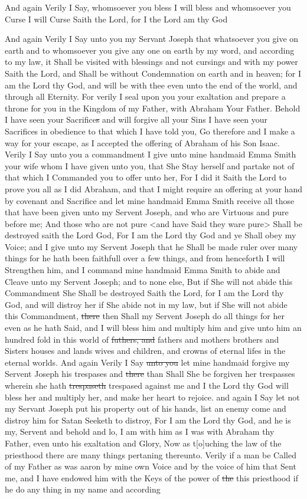 				And again Verily I Say, whomsoever you bless I will bless and whomsoever you Curse I will Curse Saith the Lord, for I the Lord am thy God

				And again Verily I Say unto you my Servant Joseph that whatsoever you give on earth and to whomsoever you give any one on earth by my word, and according to my law, it Shall be visited with blessings and not cursings and with my power Saith the Lord, and Shall be without Condemnation on earth and in heaven; for I am the Lord thy God, and will be with thee even unto the end of the world, and through all Eternity. For verily I seal upon you your exaltation and prepare a throne for you in the Kingdom of my Father, with Abraham Your Father. Behold I have seen your Sacrifice\sout{s} and will forgive all your Sins I have seen your Sacrifices in obedience to that which I have told you, Go therefore and I make a way for your escape, as I accepted the offering of Abraham of his Son Isaac. Verily I Say unto you a commandment I give unto mine handmaid Emma Smith your wife whom I have given unto you, that She Stay herself and partake not of that which I Commanded you to offer unto her, For I did it Saith the Lord to prove you all as I did Abraham, and that I might require an offering at your hand by covenant and Sacrifice and let mine handmaid Emma Smith receive all those that have been given unto my Servent Joseph, and who are Virtuous and pure before me; And those who are not pure <and have Said they ware pure> Shall be destroyed saith the Lord God, For I am the Lord thy God and ye Shall obey my Voice; and I give unto my Servent Joseph that he Shall be made ruler over many things for he hath been faithfull over a few things, and from henceforth I will Strengthen him, and I command mine handmaid Emma Smith to abide and Cleave unto my Servent Joseph; and to none else, But if She will not abide this Commandment She Shall be destroyed Saith the Lord, for I am the Lord thy God, and will distroy her if She abide not in my law, but if She will not abide this Commandment, \sout{there} then Shall my Servent Joseph do all things for her even as he hath Said, and I will bless him and multiply him and give unto him an hundred fold in this world of \sout{futhers, and} fathers and mothers brothers and Sisters houses and lands wives and children, and crowns of eternal lifes in the eternal worlds. And again Verily I Say \sout{unto you} let mine handmaid forgive my Servent Joseph his trespases and \sout{there} than Shall She be forgiven her trespasses wherein she hath \sout{trespaseth} trespased against me and I the Lord thy God will bless her and multiply her, and make her heart to rejoice. and again I Say let not my Servant Joseph put his property out of his hands, list an enemy come and distroy him for Satan Seeketh to distroy, For I am the Lord thy God, and he is my, Servent and behold and lo, I am with him as I was with Abraham thy Father, even unto his exaltation and Glory, Now as t[o]uching the law of the priesthood there are many things pertaning thereunto. Verily if a man be Called of my Father as was aaron by mine own Voice and by the voice of him that Sent me, and I have endowed him with the Keys of the power of \sout{the} this priesthood if he do any thing in my name and according 